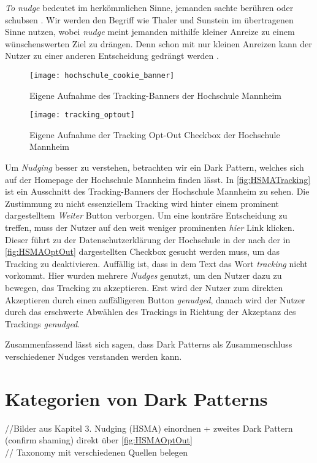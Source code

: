 \documentclass[conference,compsoc,final,a4paper]{IEEEtran}
\begin{document}
\textit{To nudge} bedeutet im herkömmlichen Sinne, jemanden sachte berühren oder schubsen \autocite{MerriamWebsterNudge}. Wir werden den Begriff wie Thaler und Sunstein im übertragenen Sinne nutzen, wobei \textit{nudge} meint jemanden mithilfe kleiner Anreize zu einem wünschenswerten Ziel zu drängen. Denn schon mit nur kleinen Anreizen kann der Nutzer zu einer anderen Entscheidung gedrängt werden \autocite{Narayanan2020}.

\begin{figure}[!ht]
\centering
\texttt{[image: hochschule\_cookie\_banner]}
\caption{Eigene Aufnahme des Tracking-Banners der Hochschule Mannheim~\autocite{HSMAWebsite2021}}
\label{fig:HSMATracking}
\end{figure}

\begin{figure}[!ht]
\centering
\texttt{[image: tracking\_optout]}
\caption{Eigene Aufnahme der Tracking Opt-Out Checkbox der Hochschule Mannheim~\autocite{HSMAWebsite2021}}
\label{fig:HSMAOptOut}
\end{figure}

Um \textit{Nudging} besser zu verstehen, betrachten wir ein Dark Pattern, welches sich auf der Homepage der Hochschule Mannheim finden lässt. In \autoref{fig:HSMATracking} ist ein Ausschnitt des Tracking-Banners der Hochschule Mannheim zu sehen. Die Zustimmung zu nicht essenziellem Tracking wird hinter einem prominent dargestelltem \textit{Weiter} Button verborgen. Um eine konträre Entscheidung zu treffen, muss der Nutzer auf den weit weniger prominenten \textit{hier} Link klicken. Dieser führt zu der Datenschutzerklärung der Hochschule in der nach der in \autoref{fig:HSMAOptOut} dargestellten Checkbox gesucht werden muss, um das Tracking zu deaktivieren. Auffällig ist, dass in dem Text das Wort \textit{tracking} nicht vorkommt. Hier wurden mehrere \textit{Nudges} genutzt, um den Nutzer dazu zu bewegen, das Tracking zu akzeptieren. Erst wird der Nutzer zum direkten Akzeptieren durch einen auffälligeren Button \textit{genudged}, danach wird der Nutzer durch das erschwerte Abwählen des Trackings in Richtung der Akzeptanz des Trackings \textit{genudged}.

Zusammenfassend lässt sich sagen, dass Dark Patterns als Zusammenschluss verschiedener Nudges verstanden werden kann.

\section{Kategorien von Dark Patterns}
//Bilder aus Kapitel 3. Nudging (HSMA) einordnen + zweites Dark Pattern (confirm shaming) direkt über
\autoref{fig:HSMAOptOut}\\
// Taxonomy mit verschiedenen Quellen belegen \autocite*{Gray_2018,M.Bhoot2020,Brignull}
\end{document}
